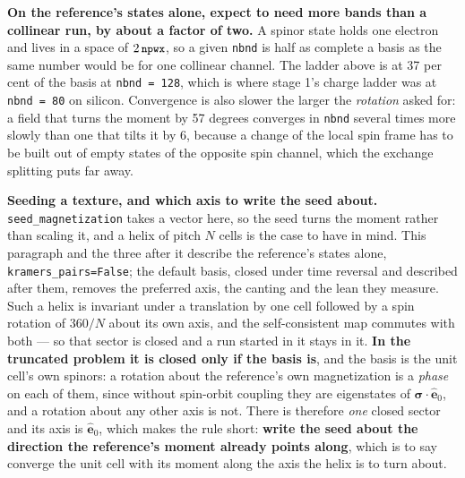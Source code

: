 \documentclass[11pt,a4paper]{article}
\newcommand{\code}[1]{\texttt{\small #1}}
\begin{document}
\textbf{On the reference's states alone, expect to need more bands than a
collinear run, by about a factor of two.} A spinor state holds one electron and lives in a space of
$2\,\code{npwx}$, so a given \code{nbnd} is half as complete a basis as the same
number would be for one collinear channel. The ladder above is at 37 per cent of
the basis at \code{nbnd = 128}, which is where stage 1's charge ladder was at
\code{nbnd = 80} on silicon. Convergence is also slower the larger the
\emph{rotation} asked for: a field that turns the moment by 57 degrees converges
in \code{nbnd} several times more slowly than one that tilts it by 6, because a
change of the local spin frame has to be built out of empty states of the
opposite spin channel, which the exchange splitting puts far away.

\textbf{Seeding a texture, and which axis to write the seed about.}
\code{seed\_magnetization} takes a vector here, so the seed turns the moment
rather than scaling it, and a helix of pitch $N$ cells is the case to have in
mind. This paragraph and the three after it describe the reference's states
alone, \code{kramers\_pairs=False}; the default basis, closed under time
reversal and described after them, removes the preferred axis, the canting and
the lean they measure. Such a helix is invariant under a translation by one cell followed by a
spin rotation of $360/N$ about its own axis, and the self-consistent map
commutes with both --- so that sector is closed and a run started in it stays in
it. \textbf{In the truncated problem it is closed only if the basis is}, and the
basis is the unit cell's own spinors: a rotation about the reference's own
magnetization is a \emph{phase} on each of them, since without spin-orbit
coupling they are eigenstates of
$\boldsymbol\sigma\cdot\hat{\mathbf e}_0$, and a rotation about any other axis is
not. There is therefore \emph{one} closed sector and its axis is
$\hat{\mathbf e}_0$, which makes the rule short: \textbf{write the seed about the
direction the reference's moment already points along}, which is to say converge
the unit cell with its moment along the axis the helix is to turn about.
\end{document}
